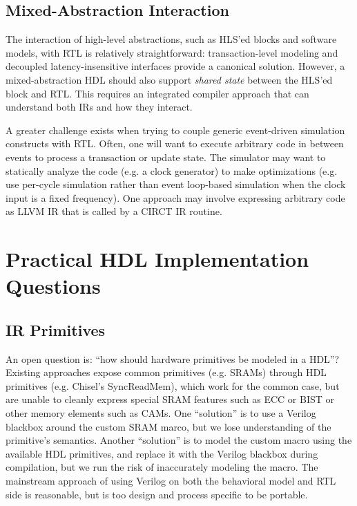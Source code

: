 \documentclass[sigplan,review,nonacm,10pt]{acmart}
\begin{document}
\subsection{Mixed-Abstraction Interaction}

The interaction of high-level abstractions, such as HLS'ed blocks and software models, with RTL is relatively straightforward: transaction-level modeling and decoupled latency-insensitive interfaces provide a canonical solution\cite{umoc}.
However, a mixed-abstraction HDL should also support \textit{shared state} between the HLS'ed block and RTL.
This requires an integrated compiler approach that can understand both IRs and how they interact.

A greater challenge exists when trying to couple generic event-driven simulation constructs with RTL.
Often, one will want to execute arbitrary code in between events to process a transaction or update state.
The simulator may want to statically analyze the code (e.g. a clock generator) to make optimizations (e.g. use per-cycle simulation rather than event loop-based simulation when the clock input is a fixed frequency).
One approach may involve expressing arbitrary code as LLVM IR that is called by a CIRCT IR routine.

\section{Practical HDL Implementation Questions}


\subsection{IR Primitives}


An open question is: ``how should hardware primitives be modeled in a HDL''?
Existing approaches expose common primitives (e.g. SRAMs) through HDL primitives (e.g. Chisel's SyncReadMem), which work for the common case, but are unable to cleanly express special SRAM features such as ECC or BIST or other memory elements such as CAMs.
One ``solution'' is to use a Verilog blackbox around the custom SRAM marco, but we lose understanding of the primitive's semantics.
Another ``solution'' is to model the custom macro using the available HDL primitives, and replace it with the Verilog blackbox during compilation, but we run the risk of inaccurately modeling the macro.
The mainstream approach of using Verilog on both the behavioral model and RTL side is reasonable, but is too design and process specific to be portable.
\end{document}
